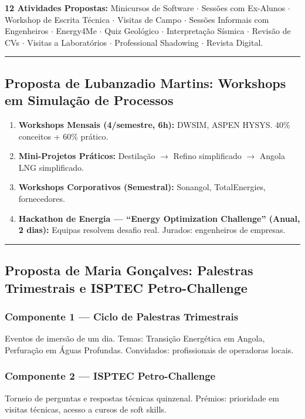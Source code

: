 \documentclass[12pt,a4paper]{article}
\newcommand{\proposalsep}{%
  \vspace{6pt}%
  {\color{gold}\rule{0.35\linewidth}{0.7pt}}%
  \vspace{4pt}%
}
\begin{document}
\textbf{12 Atividades Propostas:} Minicursos de Software $\cdot$ Sessões com Ex-Alunos $\cdot$ Workshop de Escrita Técnica $\cdot$ Visitas de Campo $\cdot$ Sessões Informais com Engenheiros $\cdot$ Energy4Me $\cdot$ Quiz Geológico $\cdot$ Interpretação Sísmica $\cdot$ Revisão de CVs $\cdot$ Visitas a Laboratórios $\cdot$ Professional Shadowing $\cdot$ Revista Digital.

\proposalsep

\subsection{Proposta de Lubanzadio Martins: Workshops em Simulação de Processos}

\begin{enumerate}
    \item \textbf{Workshops Mensais (4/semestre, 6h):} DWSIM, ASPEN HYSYS. 40\% conceitos + 60\% prático.
    \item \textbf{Mini-Projetos Práticos:} Destilação $\rightarrow$ Refino simplificado $\rightarrow$ Angola LNG simplificado.
    \item \textbf{Workshops Corporativos (Semestral):} Sonangol, TotalEnergies, fornecedores.
    \item \textbf{Hackathon de Energia — ``Energy Optimization Challenge'' (Anual, 2 dias):} Equipas resolvem desafio real. Jurados: engenheiros de empresas.
\end{enumerate}

\proposalsep

\subsection{Proposta de Maria Gonçalves: Palestras Trimestrais e ISPTEC Petro-Challenge}

\subsubsection*{Componente 1 — Ciclo de Palestras Trimestrais}
Eventos de imersão de um dia. Temas: Transição Energética em Angola, Perfuração em Águas Profundas. Convidados: profissionais de operadoras locais.

\subsubsection*{Componente 2 — ISPTEC Petro-Challenge}
Torneio de perguntas e respostas técnicas quinzenal. Prémios: prioridade em visitas técnicas, acesso a cursos de soft skills.
\end{document}
